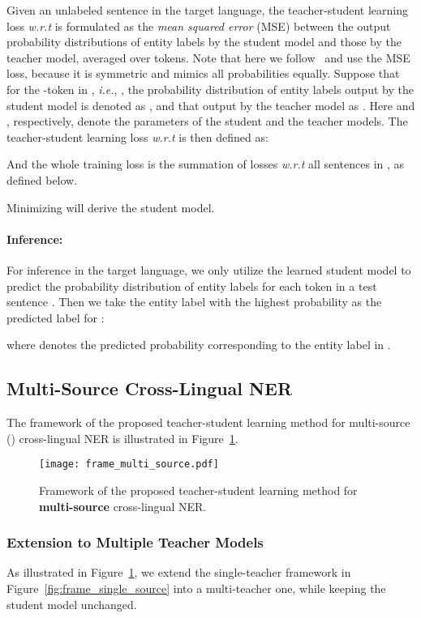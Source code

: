 \documentclass[11pt,a4paper]{article}
\newcommand\ie{\textit{i.e.}}
\newcommand\wrt{\textit{w.r.t}}
\begin{document}
	Given an unlabeled sentence  in the target language, the teacher-student learning loss \wrt{}   is formulated as the \textit{mean squared error} (MSE) between the output probability distributions of entity labels by the student model and those by the teacher model, averaged over tokens. 
	Note that here we follow~\citet{yang2019model} and use the MSE loss, because it is symmetric and mimics all probabilities equally.
	Suppose that for the -token in , \ie, , the probability distribution of entity labels output by the student model is denoted as , and that output by the teacher model as . Here  and , respectively, denote the  parameters of the student and the teacher models. The teacher-student learning loss \wrt{}  is then defined as:
	
	And the whole training loss is the summation of losses \wrt{} all sentences in , as defined below.
	
	Minimizing  will derive the student model.
	
	\paragraph{Inference: } For inference in the target language, we only utilize the learned student model to predict the probability distribution of entity labels for each token  in a test sentence . Then we take the entity label  with the highest probability as the predicted label  for :
	
	where  denotes the predicted probability corresponding to the entity label  in . 
	
	
	\subsection{Multi-Source Cross-Lingual NER}
The framework of the proposed teacher-student learning method for multi-source () cross-lingual NER is illustrated in Figure~\ref{fig:frame_multi_source}. 
	
	\begin{figure}[t]
		\centering
		\texttt{[image: frame\_multi\_source.pdf]}
		\caption{Framework of the proposed teacher-student learning method for \textbf{multi-source} cross-lingual NER.}
		\label{fig:frame_multi_source}
	\end{figure}
	
	\subsubsection{Extension to Multiple Teacher Models}
As illustrated in Figure~\ref{fig:frame_multi_source}, 
we extend the single-teacher framework in Figure~\ref{fig:frame_single_source} into a multi-teacher one, while keeping the student model unchanged. 
	
\end{document}
